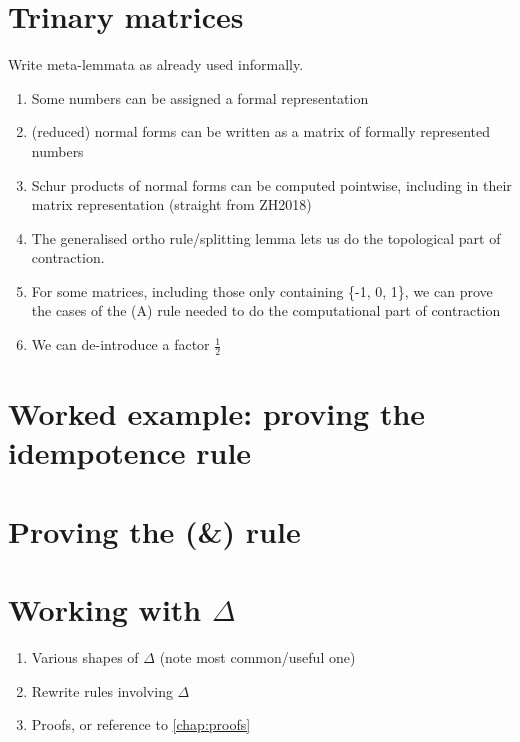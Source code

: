 \section{Trinary matrices}
\begin{TODOLIST}
    Write meta-lemmata as already used informally.
    \begin{enumerate}
        \item Some numbers can be assigned a formal representation
        \item (reduced) normal forms can be written as a matrix of formally %
            represented numbers
        \item Schur products of normal forms can be computed pointwise,
            including in their matrix representation (straight from ZH2018)
        \item The generalised ortho rule/splitting lemma lets us do the
            topological part of contraction.
        \item For some matrices, including those only containing \{-1, 0, 1\}, we
            can prove the cases of the (A) rule needed to do the computational
            part of contraction
        \item We can de-introduce a factor $\frac{1}{2}$
    \end{enumerate}
\end{TODOLIST}

\section{Worked example: proving the idempotence rule}

\section{Proving the (\&) rule}

\section{Working with $\Delta$}
\begin{TODOLIST}
\begin{enumerate}
\item Various shapes of $\Delta$ (note most common/useful one)
\item Rewrite rules involving $\Delta$
\item Proofs, or reference to \autoref{chap:proofs}
\end{enumerate}
\end{TODOLIST}




